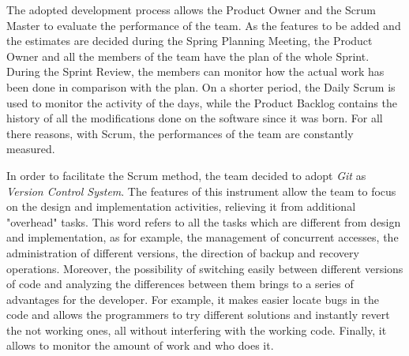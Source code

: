 		The adopted development process allows the Product Owner and the Scrum Master to evaluate the performance of the team. As the features to be added and the estimates are decided during the Spring Planning Meeting, the Product Owner and all the members of the team have the plan of the whole Sprint. During the Sprint Review, the members can monitor how the actual work has been done in comparison with the plan. On a shorter period, the Daily Scrum is used to monitor the activity of the days, while the Product Backlog contains the history of all the modifications done on the software since it was born. For all there reasons, with Scrum, the performances of the team are constantly measured.

		In order to facilitate the Scrum method, the team decided to adopt \mbox{\emph{Git}} as \emph{Version Control System}. 
		The features of this instrument allow the team to focus on the design and implementation activities, relieving it from additional "overhead" tasks.
		This word refers to all the tasks which are different from design and implementation, as for example, the management of concurrent accesses, the administration of different versions, the direction of backup and recovery operations.
		Moreover, the possibility of switching easily between different versions of code and analyzing the differences between them brings to a series of advantages for the developer.
		For example, it makes easier locate bugs in the code and allows the programmers to try different solutions and instantly revert the not working ones, all without interfering with the working code. 
		Finally, it allows to monitor the amount of work and who does it.

